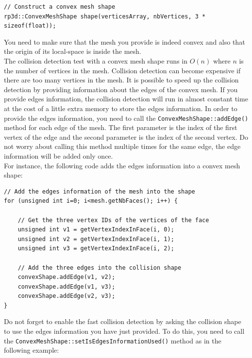 \documentclass[a4paper,12pt]{article}
\begin{document}
    \begin{lstlisting}
// Construct a convex mesh shape
rp3d::ConvexMeshShape shape(verticesArray, nbVertices, 3 * sizeof(float));
  \end{lstlisting}

    \vspace{0.6cm}

    You need to make sure that the mesh you provide is indeed convex and also that the origin of its local-space is inside the mesh. \\

    The collision detection test with a convex mesh shape runs in $O(n)$ where $n$ is the number of vertices in the mesh. Collision detection can become expensive if there are
    too many vertices in the mesh. It is possible to speed up the collision detection by providing information about the edges of the convex mesh. If you provide edges information, the collision detection will run in almost constant time at the cost of a little extra memory to store the edges information. In order to provide the edges
    information, you need to call the \texttt{ConvexMeshShape::addEdge()} method for each edge of the mesh. The first parameter is the index of the first vertex of the edge and the
    second parameter is the index of the second vertex. Do not worry about calling this method multiple times for the same edge, the edge information will be added only
    once. \\

    For instance, the following code adds the edges information into a convex mesh shape: \\

    \begin{lstlisting}
// Add the edges information of the mesh into the shape
for (unsigned int i=0; i<mesh.getNbFaces(); i++) {

    // Get the three vertex IDs of the vertices of the face
    unsigned int v1 = getVertexIndexInFace(i, 0);
    unsigned int v2 = getVertexIndexInFace(i, 1);
    unsigned int v3 = getVertexIndexInFace(i, 2);

    // Add the three edges into the collision shape
    convexShape.addEdge(v1, v2);
    convexShape.addEdge(v1, v3);
    convexShape.addEdge(v2, v3);
}
  \end{lstlisting}

    \vspace{0.6cm}

    Do not forget to enable the fast collision detection by asking the collision shape to use the edges information you have just provided. To do this, you need to
    call the \texttt{ConvexMeshShape::setIsEdgesInformationUsed()} method as in the following example: \\
\end{document}
